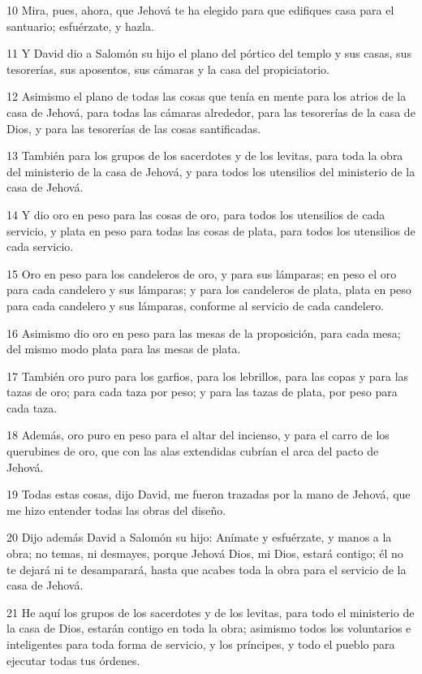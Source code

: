 \par 10 Mira, pues, ahora, que Jehová te ha elegido para que edifiques casa para el santuario; esfuérzate, y hazla.
\par 11 Y David dio a Salomón su hijo el plano del pórtico del templo y sus casas, sus tesorerías, sus aposentos, sus cámaras y la casa del propiciatorio.
\par 12 Asimismo el plano de todas las cosas que tenía en mente para los atrios de la casa de Jehová, para todas las cámaras alrededor, para las tesorerías de la casa de Dios, y para las tesorerías de las cosas santificadas.
\par 13 También para los grupos de los sacerdotes y de los levitas, para toda la obra del ministerio de la casa de Jehová, y para todos los utensilios del ministerio de la casa de Jehová.
\par 14 Y dio oro en peso para las cosas de oro, para todos los utensilios de cada servicio, y plata en peso para todas las cosas de plata, para todos los utensilios de cada servicio.
\par 15 Oro en peso para los candeleros de oro, y para sus lámparas; en peso el oro para cada candelero y sus lámparas; y para los candeleros de plata, plata en peso para cada candelero y sus lámparas, conforme al servicio de cada candelero.
\par 16 Asimismo dio oro en peso para las mesas de la proposición, para cada mesa; del mismo modo plata para las mesas de plata.
\par 17 También oro puro para los garfios, para los lebrillos, para las copas y para las tazas de oro; para cada taza por peso; y para las tazas de plata, por peso para cada taza.
\par 18 Además, oro puro en peso para el altar del incienso, y para el carro de los querubines de oro, que con las alas extendidas cubrían el arca del pacto de Jehová.
\par 19 Todas estas cosas, dijo David, me fueron trazadas por la mano de Jehová, que me hizo entender todas las obras del diseño.
\par 20 Dijo además David a Salomón su hijo: Anímate y esfuérzate, y manos a la obra; no temas, ni desmayes, porque Jehová Dios, mi Dios, estará contigo; él no te dejará ni te desamparará, hasta que acabes toda la obra para el servicio de la casa de Jehová.
\par 21 He aquí los grupos de los sacerdotes y de los levitas, para todo el ministerio de la casa de Dios, estarán contigo en toda la obra; asimismo todos los voluntarios e inteligentes para toda forma de servicio, y los príncipes, y todo el pueblo para ejecutar todas tus órdenes.

